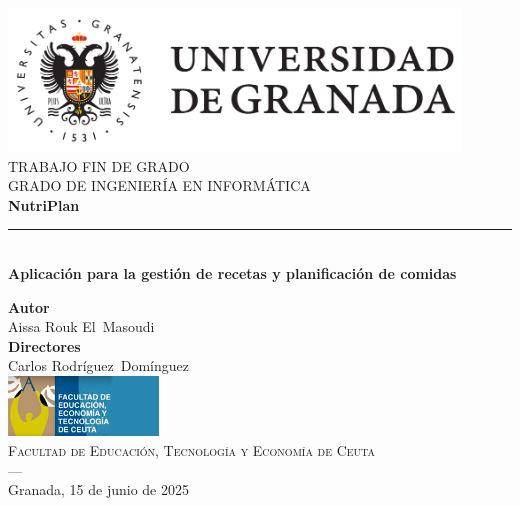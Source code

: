\documentclass[twoside, openright, 11pt]{report}
\begin{document}
\begin{titlepage}
\newlength{\centeroffset}
\setlength{\centeroffset}{-0.5\oddsidemargin}
\addtolength{\centeroffset}{0.5\evensidemargin}
\thispagestyle{empty}

\noindent\hspace*{\centeroffset}\begin{minipage}{\textwidth}
\centering
\includegraphics[width=0.9\textwidth]{imagenes/logo_ugr}\\[1.4cm]
\textsc{\Large TRABAJO FIN DE GRADO\\[0.2cm]}
\textsc{GRADO DE INGENIERÍA EN INFORMÁTICA}\\[1cm]
{\huge\bfseries NutriPlan\\}
\noindent\rule[-1ex]{\textwidth}{3pt}\\[3.5ex]
{\large\bfseries Aplicación para la gestión de recetas y planificación de comidas}
\end{minipage}

\vspace{0.5cm}
\noindent\hspace*{\centeroffset}\begin{minipage}{\textwidth}
\centering
\textbf{Autor}\\{Aissa Rouk El Masoudi}\\[2.5ex]
\textbf{Directores}\\
{Carlos Rodríguez Domínguez}\\[2cm]
\includegraphics[width=0.3\textwidth]{imagenes/logo-ceuta.jpg}\\[0.1cm]
\textsc{Facultad de Educación, Tecnología y Economía de Ceuta}\\
\textsc{---}\\
Granada, 15 de junio de 2025
\end{minipage}
\end{titlepage}
\let\cleardoublepage\clearpage
\end{document}
